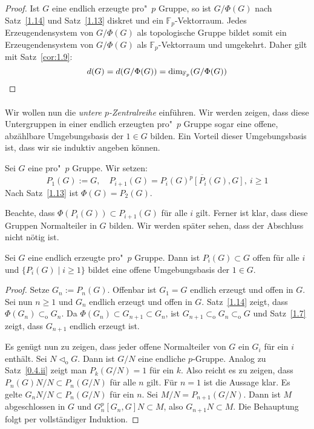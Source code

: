 \documentclass[11pt,a4paper,openany]{memoir}
\begin{document}
\begin{proof}
Ist $G$ eine endlich erzeugte pro"~$p$ Gruppe, so ist $G/\Phi(G)$ nach Satz~\ref{1.14} und Satz~\ref{1.13} diskret und ein $\mathbb{F}_p$-Vektorraum. Jedes Erzeugendensystem von $G/\Phi(G)$ als topologische Gruppe bildet somit ein Erzeugendensystem von $G/\Phi(G)$ als $\mathbb{F}_p$-Vektorraum und umgekehrt. Daher gilt mit Satz~\ref{cor:1.9}:
\[d(G)=d(G/\Phi(G))= \dim_{\mathbb{F}_p}(G/\Phi(G))\qedhere \] 
\end{proof}

\paragraph{} Wir wollen nun die \textit{untere $p$-Zentralreihe} einführen. Wir werden zeigen, dass diese Untergruppen in einer endlich erzeugten pro"~$p$ Gruppe sogar eine offene, abzählbare Umgebungsbasis der $1\in G$ bilden. Ein Vorteil dieser Umgebungsbasis ist, dass wir sie induktiv angeben können.

\begin{definition}
Sei $G$ eine pro"~$p$ Gruppe. Wir setzen:
\[P_1(G):=G,\quad P_{i+1}(G)=\overline{P_i(G)^p [P_i(G),G] },\ i\geq 1 \]
Nach Satz~\ref{1.13} ist $\Phi(G)=P_2(G)$.
\end{definition}

\begin{remark}
Beachte, dass $\Phi(P_i(G))\subset P_{i+1}(G)$ für alle $i$ gilt. Ferner ist klar, dass diese Gruppen Normalteiler in $G$ bilden. Wir werden später sehen, dass der Abschluss nicht nötig ist.
\end{remark}

\begin{proposition}\label{1.16}
Sei $G$ eine endlich erzeugte pro"~$p$ Gruppe. Dann ist $P_i(G)\subset G$ offen für alle $i$ und $\{P_i(G)\mid i\geq 1\}$ bildet eine offene Umgebungsbasis der $1\in G$.
\end{proposition}

\begin{proof}
Setze $G_n:=P_n(G)$. Offenbar ist $G_1=G$ endlich erzeugt und offen in $G$. Sei nun $n\geq 1$ und $G_n$ endlich erzeugt und offen in $G$. Satz~\ref{1.14} zeigt, dass $\Phi(G_n)\subset_\text{o} G_n$. Da $\Phi(G_n)\subset G_{n+1}\subset G_n$, ist $G_{n+1}\subset_\text{o}G_n\subset_\text{o}G$ und Satz~\ref{1.7} zeigt, dass $G_{n+1}$ endlich erzeugt ist.

Es genügt nun zu zeigen, dass jeder offene Normalteiler von $G$ ein $G_i$ für ein $i$ enthält. Sei $N\lhd_\text{o}G$. Dann ist $G/N$ eine endliche $p$-Gruppe. Analog zu Satz~\ref{0.4.ii} zeigt man $P_k(G/N)=1$ für ein $k$. Also reicht es zu zeigen, dass $P_n(G)N/N\subset P_n(G/N)$ für alle $n$ gilt. Für $n=1$ ist die Aussage klar. Es gelte $G_nN/N\subset P_n(G/N)$ für ein $n$. Sei $M/N=P_{n+1}(G/N)$. Dann ist $M$ abgeschlossen in $G$ und $G_n^p[G_n,G]N\subset M$, also $G_{n+1}N\subset M$. Die Behauptung folgt per vollständiger Induktion.
\end{proof}
\end{document}
